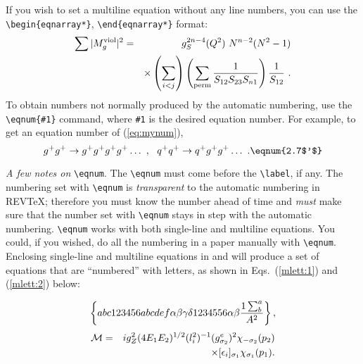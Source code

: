 If you wish to set a multiline equation without any line numbers,
you can use the \verb+\begin{eqnarray*}+,
\verb+\end{eqnarray*}+ format:
\begin{eqnarray*}
\sum \vert M^{\rm viol}_g \vert ^2&=&g^{2n-4}_S(Q^2)~N^{n-2}
        (N^2-1)\\
 & &\times \left( \sum_{i<j}\right)
 \left( \sum_{\rm perm}
 {1 \over S_{12}S_{23}S_{n1}}\right)
 {1 \over S_{12}}~.
\end{eqnarray*}
To obtain numbers not normally produced by the automatic numbering,
use the \verb+\eqnum{#1}+ command, where \verb+#1+ is the desired
equation number. For example, to get an equation number of
(\ref{eq:mynum}),
\begin{equation}
g^+g^+ \rightarrow g^+g^+g^+g^+ \dots ~,~~q^+q^+\rightarrow
q^+g^+g^+ \dots ~. \eqnum{2.7$'$}\label{eq:mynum}
\end{equation}

{\it A few notes on} \verb=\eqnum=.
The \verb+\eqnum+ must come before the \verb+\label+, if any.
The numbering set with \verb+\eqnum+ is {\it transparent} to the
automatic numbering in REV\TeX; therefore
you must know the number ahead of time and {\it must\/} make
sure that the number set with \verb+\eqnum+ stays in step
with the automatic numbering.
\verb+\eqnum+ works with both single-line and multiline equations.
You could, if you wished, do all the numbering in a paper
manually with \verb+\eqnum+.
Enclosing single-line and multiline equations in 
and  will produce
a set of equations that are ``numbered'' with letters, as shown
in Eqs.\ (\ref{mlett:1}) and (\ref{mlett:2}) below:
\begin{mathletters}
\begin{equation}
\left\{abc123456abcdef\alpha\beta\gamma\delta%
1234556\alpha\beta{1\sum^{a}_{b}\over A^2}\right\},\label{mlett:1}
\end{equation}
\begin{eqnarray}
{\cal M}=&&ig_Z^2(4E_1E_2)^{1/2}(l_i^2)^{-1}
(g_{\sigma_2}^e)^2\chi_{-\sigma_2}(p_2)\nonumber\\
&&\times
[\epsilon_i]_{\sigma_1}\chi_{\sigma_1}(p_1).\label{mlett:2}
\end{eqnarray}
\end{mathletters}

